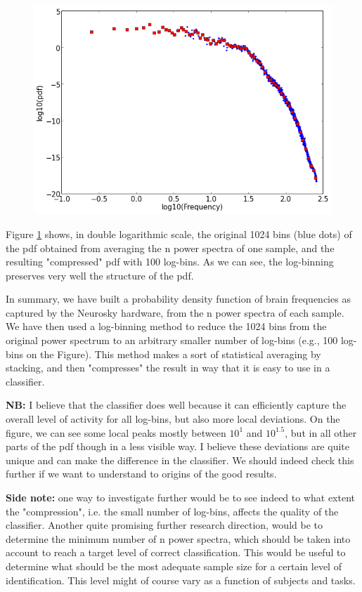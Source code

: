 \begin{figure}
\begin{center}
\includegraphics[width=5in]{Figures/binned_EEGpowerspectrum.png}
\caption{ }
\label{binnedEEGpowerspec}
\end{center}
\end{figure}

Figure \ref{binnedEEGpowerspec} shows, in double logarithmic scale, the original 1024 bins (blue dots) of the pdf obtained from averaging the n power spectra of one sample, and the resulting "compressed"  pdf with 100 log-bins. As we can see, the log-binning preserves very well the structure of the pdf.

In summary, we have built a probability density function of brain frequencies as captured by the Neurosky hardware, from the n power spectra of each sample. We have then used a log-binning method to reduce the 1024 bins from the original power spectrum to an arbitrary smaller number of log-bins (e.g., 100 log-bins on the Figure). This method makes a sort of statistical averaging by stacking, and then "compresses" the result in way that it is easy to use in a classifier.

{\bf NB:} I believe that the classifier does well because it can efficiently capture the overall level of activity for all log-bins, but also more local deviations. On the figure, we can see some local peaks mostly between $10^1$ and $10^1.5$, but in all other parts of the pdf though in a less visible way. I believe these deviations are quite unique and can make the difference in the classifier. We should indeed check this further if we want to understand to origins of the good results.

{\bf Side note:} one way to investigate further would be to see indeed to what extent the "compression", i.e. the small number of log-bins, affects the quality of the classifier. Another quite promising further research direction, would be to determine the minimum number of n power spectra, which should be taken into account to reach a target level of correct classification. This would be useful to determine what should be the most adequate sample size for a certain level of identification. This level might of course vary as a function of subjects and tasks.


